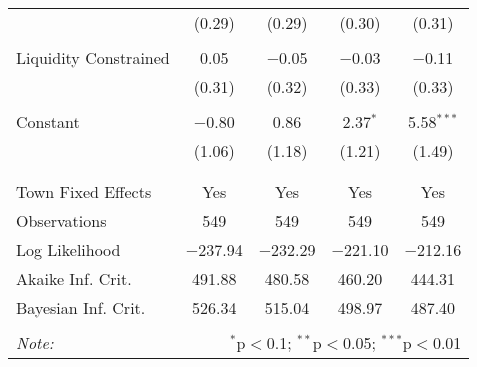 \begin{table}[!htbp]
\begin{tabular}{@{\extracolsep{5pt}}lcccc}
  & (0.29) & (0.29) & (0.30) & (0.31) \\ 
  & & & & \\ 
 Liquidity Constrained & 0.05 & $-$0.05 & $-$0.03 & $-$0.11 \\ 
  & (0.31) & (0.32) & (0.33) & (0.33) \\ 
  & & & & \\ 
 Constant & $-$0.80 & 0.86 & 2.37$^{*}$ & 5.58$^{***}$ \\ 
  & (1.06) & (1.18) & (1.21) & (1.49) \\ 
  & & & & \\ 
\hline \\[-1.8ex] 
Town Fixed Effects & Yes & Yes & Yes & Yes \\ 
Observations & 549 & 549 & 549 & 549 \\ 
Log Likelihood & $-$237.94 & $-$232.29 & $-$221.10 & $-$212.16 \\ 
Akaike Inf. Crit. & 491.88 & 480.58 & 460.20 & 444.31 \\ 
Bayesian Inf. Crit. & 526.34 & 515.04 & 498.97 & 487.40 \\ 
\hline 
\hline \\[-1.8ex] 
\textit{Note:}  & \multicolumn{4}{r}{$^{*}$p$<$0.1; $^{**}$p$<$0.05; $^{***}$p$<$0.01} \\ 
\end{tabular} 
\end{table} 
